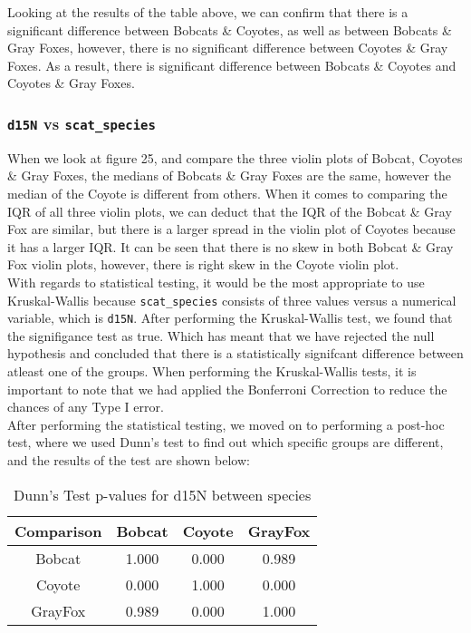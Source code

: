 \documentclass[a4paper]{article}
\begin{document}
\noindent Looking at the results of the table above, we can confirm that there is a significant difference between Bobcats \& Coyotes, as well as between
Bobcats \& Gray Foxes, however, there is  no significant difference between Coyotes \& Gray Foxes. As a result, there is significant difference between 
Bobcats \& Coyotes and Coyotes \& Gray Foxes.

\subsubsection{\texttt{d15N} vs \texttt{scat\_species}}
When we look at figure 25, and compare the three violin plots of Bobcat, Coyotes \& Gray Foxes, the medians of Bobcats \& Gray Foxes are the same, however
the median of the Coyote is different from others. When it comes to comparing the IQR of all three violin plots, we can deduct that the IQR of the Bobcat \&
Gray Fox are similar, but there is a larger spread in the violin plot of Coyotes because it has a larger IQR. It can be seen that there is no skew in both
Bobcat \& Gray Fox violin plots, however, there is right skew in the Coyote violin plot. \\

\noindent With regards to statistical testing, it would be the most appropriate to use Kruskal-Wallis because \texttt{scat\_species} consists of three values
versus a numerical variable, which is \texttt{d15N}. After performing the Kruskal-Wallis test, we found that the signifigance test as true. Which has meant 
that we have rejected the null hypothesis and concluded that there is a statistically signifcant difference between atleast one of the groups. When performing 
the Kruskal-Wallis tests, it is important to note that we had applied the Bonferroni Correction to reduce the chances of any Type I error. \\

\noindent After performing the statistical testing, we moved on to performing a post-hoc test, where we used Dunn's test to find out which specific groups are
different, and the results of the test are shown below: \\

\begin{table}[h!]
    \centering
    \begin{tabular}{|c|c|c|c|}
    \hline
    \textbf{Comparison} & \textbf{Bobcat} & \textbf{Coyote} & \textbf{GrayFox} \\
    \hline
    Bobcat & 1.000 & 0.000 & 0.989 \\
    \hline
    Coyote & 0.000 & 1.000 & 0.000 \\
    \hline
    GrayFox & 0.989 & 0.000 & 1.000 \\
    \hline
    \end{tabular}
    \caption{Dunn's Test p-values for d15N between species}
    \label{tab:dunn_d15N}
\end{table}
\end{document}
